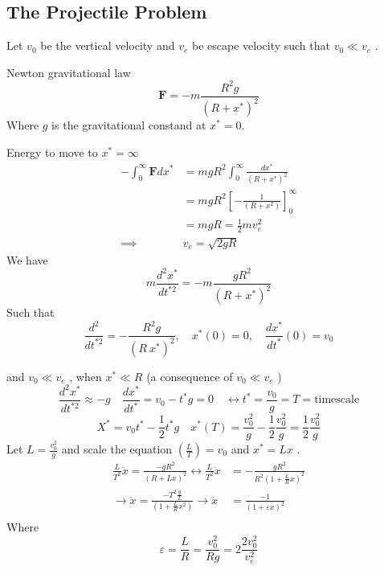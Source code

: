 \documentclass{article}
\theoremstyle{remark}
\newcommand{\newpara}
  {
  \vskip 0.4cm
  }
\begin{document}
\subsection{The Projectile Problem}%
\label{sub:the_projectile_problem}

Let $v_{0}$ be the vertical velocity and $v_{e}$ be escape velocity such that $v_{0} \ll  v_{e}$ . 

\newpara
Newton gravitational law \[
\mathbf{F} = -m \frac{R^2 g}{ \left( R+ x^{*} \right)^2} 
\] 
Where $g$ is the gravitational constand at $x^{*} = 0$. 

\newpara
Energy to move to $x^{*} = \infty$ \[
  \begin{split}
- \int_{0}^{\infty}  \mathbf{F} dx^{*} &= mg R^2 \int_{ 0}^{ \infty}  \frac{dx^{*}}{\left( R + x^{* }  \right)^2}   \\ 
 &=  mg R^2 \left[ - \frac{1}{\left( R + x^2 \right)}  \right]_0^{\infty} \\
 &=  mg R  = \frac{1}{2} mv_{e}^2 \\
 \implies   &  v_{e} = \sqrt{2gR} 
  \end{split} 
\] 
We have \[
m \frac{d ^{2} x^{*}}{d t^{*2} } = -m \frac{g R^2}{ \left( R + x^{* } \right) ^2}  
\] 
Such that \[
  \frac{d ^2}{d t^{*2}}  =  - \frac{R^2 g }{\left( R \ x^{* }  \right)^2} , \quad  x^{*} \left( 0 \right) = 0, \quad  \frac{d x^{*}}{d t^{*}}  \left( 0 \right)  = v_{0}  
\] 

and $v_{0}\ll  v_{e}$ , when $x^{* } \ll  R$  (a consequence of $v _{0} \ll  v_{e}$ ) \[
\frac{d ^2 x^{* }}{d t^{*2}}  \approx -g \quad  \frac{d x^{* }}{d t^{*} }  = v_{0} - t^{* } g  = 0      \quad  \leftrightarrow  t^{* } = \frac{v_{0}}{ g}  = T = \text{timescale}  
\] 
\[
X^{* } = v_{0} t^{* } - \frac{1}{ 2}  t^{* } g \quad x^{* } \left( T \right) = \frac{v_{0}^2}{g}  - \frac{1}{2}  \frac{v_{0} ^2 }{g}  = \frac{1}{2} \frac{v_{0}^2}{g}   
\] 
Let $L = \frac{v_{0}^2}{g} $ and scale the equation $\left( \frac{L}{T}  \right) = v_{0}$ and $x^{*} = Lx$ . \[
  \begin{split}
  \frac{L}{T^2}  \ddot{x} = \frac{-g R ^2}{\left( R + Lx \right) ^2} \leftrightarrow  \frac{L}{T^2}   \ddot{x}  & =  -\frac{g R^2}{ R^2 \left( 1  + \frac{L}{R} x \right)^2}  \\
  \to  \ddot{x} = \frac{-T^2 \frac{g}{L} }{\left( 1 + \frac{L}{R} x^2 \right)} \to  \ddot{x} &=  \frac{-1}{ \left( 1+ \varepsilon  x \right)^2}  \\
  \end{split} 
\] 
Where \[
\varepsilon  = \frac{L}{R} = \frac{v_{0} ^2}{Rg} = 2 \frac{2 v_{0}^2}{v_{e}^2}   
\]  
\end{document}
